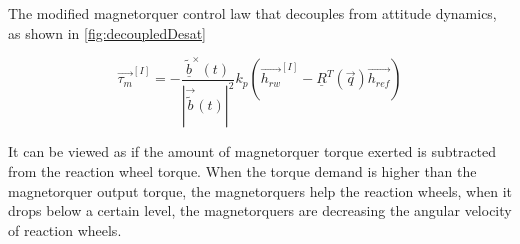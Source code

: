 The modified magnetorquer control law that decouples from attitude dynamics, as shown in \ref{fig:decoupledDesat}


\begin{equation}
\vec{\tau_m}^{[I]} = -\frac{\underline{\tilde{b}}^\times(t)}{|\vec{\tilde{b}}(t) |^2} k_p\left(\vec{h_{rw}}^{[I]} - \underline{R}^T(\vec{q})\vec{h_{ref}} \right)
\end{equation}

It can be viewed as if the amount of magnetorquer torque exerted is subtracted from the reaction wheel torque. When the torque demand is higher than the magnetorquer output torque, the magnetorquers help the reaction wheels, when it drops below a certain level, the magnetorquers are decreasing the angular velocity of reaction wheels.


%
%
%
